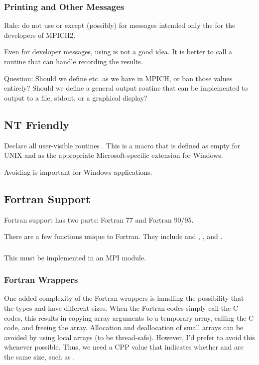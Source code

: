 \documentclass{article}
\begin{document}
\subsubsection{Printing and Other Messages}
Rule: do not use  or  except (possibly) for
messages intended only the for the developers of MPICH2.

Even for developer messages, using  is not a good idea.
It is better to call a routine that can handle recording the results.


Question: Should we define  etc. as we have in MPICH, or
ban those values entirely?  Should we define a general output routine
that can be implemented to output to a file, stdout, or a graphical display?

\subsection{NT Friendly}

Declare all user-visible routines .
This is a 
macro that is defined as empty for UNIX and as the appropriate
Microsoft-specific extension for Windows.

Avoiding  is important for Windows applications.

\subsection{Fortran Support}
Fortran support has two parts: Fortran 77 and Fortran 90/95.  

There are a few functions unique to Fortran.  They include
 and , 
, and 
.


\subsubsection{}
This must be implemented in an MPI module.

\subsubsection{Fortran Wrappers}
One added complexity of the Fortran wrappers is handling the possibility that
the types  and  have different sizes.  When the
Fortran codes simply call the C codes, this results in copying array arguments
to a temporary array, calling the C code, and freeing the array.  Allocation
and deallocation of small arrays can be avoided by using local arrays (to be
thread-safe).  However, I'd prefer to avoid this whenever possible.  Thus, we
need a CPP value that indicates whether  and  are the
same size, such as .
\end{document}
